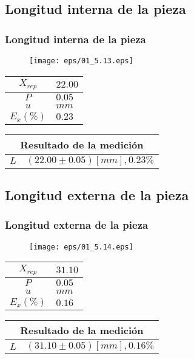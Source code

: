 \documentclass[letter,11pt]{beamer}
\begin{document}
\subsection{Longitud interna de la pieza}
\begin{frame}
\frametitle{Longitud interna de la pieza}
\vspace*{0.8cm}
\begin{figure}
\centering
\texttt{[image: eps/01\_5.13.eps]}
\end{figure}
\vspace*{0.4cm}
\scriptsize
\begin{tabular}{|c|>{\centering}m{1.8cm}<{\centering}|}
\hline
$X_{rep}$ &  $22.00$ \tabularnewline \hline
      $P$ &   $0.05$ \tabularnewline \hline
      $u$ &     $mm$ \tabularnewline \hline
$E_x(\%)$ &   $0.23$ \tabularnewline \hline
\end{tabular}
\quad
\begin{tabular}{|c|>{\centering}m{5.7cm}<{\centering}|}
\hline
\multicolumn{2}{|c|}{\textbf{Resultado de la medición}} \\ \hline
$L$ & $( 22.00\pm0.05)[mm], 0.23\%$ \tabularnewline \hline
\end{tabular}
\end{frame}

\subsection{Longitud externa de la pieza}
\begin{frame}
\frametitle{Longitud externa de la pieza}
\vspace*{0.8cm}
\begin{figure}
\centering
\texttt{[image: eps/01\_5.14.eps]}
\end{figure}
\vspace*{0.4cm}
\scriptsize
\begin{tabular}{|c|>{\centering}m{1.8cm}<{\centering}|}
\hline
$X_{rep}$ &  $31.10$ \tabularnewline \hline
      $P$ &   $0.05$ \tabularnewline \hline
      $u$ &     $mm$ \tabularnewline \hline
$E_x(\%)$ &   $0.16$ \tabularnewline \hline
\end{tabular}
\quad
\begin{tabular}{|c|>{\centering}m{5.7cm}<{\centering}|}
\hline
\multicolumn{2}{|c|}{\textbf{Resultado de la medición}} \\ \hline
$L$ & $( 31.10\pm0.05)[mm], 0.16\%$ \tabularnewline \hline
\end{tabular}
\end{frame}
\end{document}
